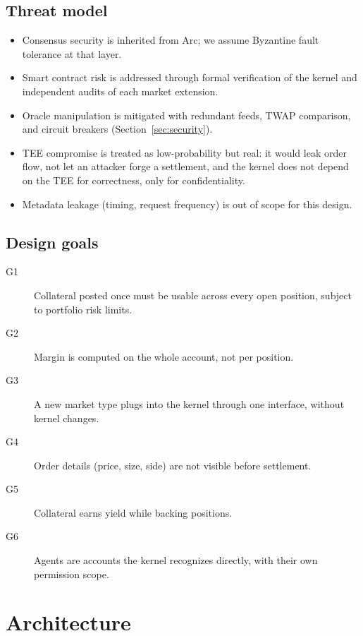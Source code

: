 \documentclass[11pt,a4paper]{article}
\begin{document}
\subsection{Threat model}

\begin{itemize}
  \item Consensus security is inherited from Arc; we assume Byzantine fault tolerance at that layer.
  \item Smart contract risk is addressed through formal verification of the kernel and independent audits of each market extension.
  \item Oracle manipulation is mitigated with redundant feeds, TWAP comparison, and circuit breakers (Section~\ref{sec:security}).
  \item TEE compromise is treated as low-probability but real: it would leak order flow, not let an attacker forge a settlement, and the kernel does not depend on the TEE for correctness, only for confidentiality.
  \item Metadata leakage (timing, request frequency) is out of scope for this design.
\end{itemize}

\subsection{Design goals}

\begin{description}
  \item[G1] Collateral posted once must be usable across every open position, subject to portfolio risk limits.
  \item[G2] Margin is computed on the whole account, not per position.
  \item[G3] A new market type plugs into the kernel through one interface, without kernel changes.
  \item[G4] Order details (price, size, side) are not visible before settlement.
  \item[G5] Collateral earns yield while backing positions.
  \item[G6] Agents are accounts the kernel recognizes directly, with their own permission scope.
\end{description}

\section{Architecture}
\label{sec:architecture}
\end{document}
